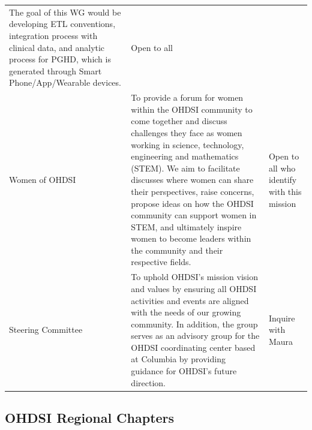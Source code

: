 \documentclass[11pt]{book}
\theoremstyle{definition}
\theoremstyle{definition}
\theoremstyle{definition}
\theoremstyle{remark}
\begin{document}
\begin{longtable}[]{@{}lll@{}}
\begin{minipage}[t]{0.51\columnwidth}
The goal of this WG would be developing ETL conventions, integration process with clinical data, and analytic process for PGHD, which is generated through Smart Phone/App/Wearable devices.\strut
\end{minipage} & \begin{minipage}[t]{0.27\columnwidth}\raggedright
Open to all\strut
\end{minipage}\tabularnewline
\begin{minipage}[t]{0.13\columnwidth}\raggedright
Women of OHDSI\strut
\end{minipage} & \begin{minipage}[t]{0.51\columnwidth}\raggedright
To provide a forum for women within the OHDSI community to come together and discuss challenges they face as women working in science, technology, engineering and mathematics (STEM). We aim to facilitate discusses where women can share their perspectives, raise concerns, propose ideas on how the OHDSI community can support women in STEM, and ultimately inspire women to become leaders within the community and their respective fields.\strut
\end{minipage} & \begin{minipage}[t]{0.27\columnwidth}\raggedright
Open to all who identify with this mission\strut
\end{minipage}\tabularnewline
\begin{minipage}[t]{0.13\columnwidth}\raggedright
Steering Committee\strut
\end{minipage} & \begin{minipage}[t]{0.51\columnwidth}\raggedright
To uphold OHDSI's mission vision and values by ensuring all OHDSI activities and events are aligned with the needs of our growing community. In addition, the group serves as an advisory group for the OHDSI coordinating center based at Columbia by providing guidance for OHDSI's future direction.\strut
\end{minipage} & \begin{minipage}[t]{0.27\columnwidth}\raggedright
Inquire with Maura\strut
\end{minipage}\tabularnewline
\bottomrule
\end{longtable}

\hypertarget{ohdsi-regional-chapters}{%
\subsection{OHDSI Regional Chapters}\label{ohdsi-regional-chapters}}
\end{document}
